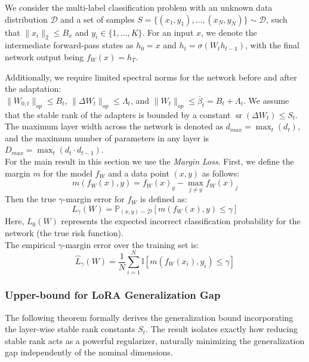 \documentclass[a4paper,14pt]{extarticle}
\DeclareMathOperator{\sr}{sr}
\begin{document}
    We consider the multi-label classification problem with an unknown data distribution $\mathcal{D}$ and a set of samples $S = \{(x_1, y_1), \dots, (x_N, y_N)\}\sim \mathcal{D}$, such that $\|x_i\|_2 \leqslant B_x$ and $y_i \in \{1, \dots, K\}$. For an input $x$, we denote the intermediate forward-pass states as
    $h_0 = x$ and $h_t = \sigma(W_t h_{t-1})$, with the final network output being $f_W(x) = h_T$.
    
    Additionally, we require limited spectral norms for the network before and after the adaptation: \\
    $\|W_{0,t}\|_{op} \leqslant B_t$, $\|\Delta W_t\|_{op} \leqslant \Lambda_t$, and $\|W_t\|_{op} \leqslant \bar{\beta}_t = B_t + \Lambda_t$. We assume that the stable rank of the adapters is bounded by a constant $\sr(\Delta W_t) \leqslant S_t$. The maximum layer width across the network is denoted as $d_{max} = \max_t (d_t)$, and the maximum number of parameters in any layer is $D_{max} = \max_t (d_t \cdot d_{t-1})$.\\

    For the main result in this section we use the \textit{Margin Loss}. First, we define the margin $m$ for the model $f_W$ and a data point $(x, y)$ as follows:
    $$ m(f_W(x), y) = f_W(x)_y - \max_{j \neq y} f_W(x)_j $$
    Then the true $\gamma$-margin error for $f_W$ is defined as:
    $$L_\gamma(W) = \mathbb{P}_{(x,y) \sim \mathcal{D}}\left[ m(f_W(x), y) \leqslant \gamma \right]$$
    Here, $L_0(W)$ represents the expected incorrect classification probability for the network (the true risk function). \\
    The empirical $\gamma$-margin error over the training set is:
    $$\widehat{L}_\gamma(W) = \frac{1}{N} \sum_{i=1}^N \mathbb{I}\left[ m(f_W(x_i), y_i) \leqslant \gamma \right]$$



    \subsubsection{Upper-bound for LoRA Generalization Gap}

    The following theorem formally derives the generalization bound incorporating the layer-wise stable rank constants $S_t$. The result isolates exactly how reducing stable rank acts as a powerful regularizer, naturally minimizing the generalization gap independently of the nominal dimensions.
\end{document}

